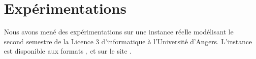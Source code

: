 \section{Expérimentations}
\label{sec:experimentations}

% 
% 

Nous avons mené des expérimentations sur une instance réelle modélisant le second semestre de la Licence 3 d'informatique à l'Université d'Angers.
L'instance est disponible aux formats \XML{}, \JSON{} et \DZN{} sur le site \cite{uspSite}.


